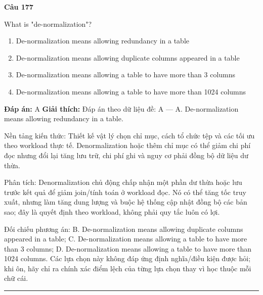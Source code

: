 \documentclass[11pt,a4paper]{article}
\newenvironment{question}[1]{%
  \par\vspace{1em}\noindent\textbf{\large Câu #1}\par\vspace{0.4em}
}{%
  \par\vspace{1em}\hrule\vspace{0.6em}
}
\newenvironment{choices}{%
  \begin{enumerate}[label=\textbf{\Alph*.},leftmargin=2.2em,itemsep=2pt,topsep=3pt]
}{%
  \end{enumerate}
}
\newcommand{\choice}{\item}
\begin{document}
\begin{question}{177}
What is "de-normalization"?
\begin{choices}
\choice De-normalization means allowing redundancy in a table
\choice De-normalization means allowing duplicate columns appeared in a table
\choice De-normalization means allowing a table to have more than 3 columns
\choice De-normalization means allowing a table to have more than 1024 columns
\end{choices}
\textbf{Đáp án:} A
\textbf{Giải thích:} Đáp án theo dữ liệu đề: A — A. De-normalization means allowing redundancy in a table.

Nền tảng kiến thức: Thiết kế vật lý chọn chỉ mục, cách tổ chức tệp và các tối ưu theo workload thực tế. Denormalization hoặc thêm chỉ mục có thể giảm chi phí đọc nhưng đổi lại tăng lưu trữ, chi phí ghi và nguy cơ phải đồng bộ dữ liệu dư thừa.

Phân tích: Denormalization chủ động chấp nhận một phần dư thừa hoặc lưu trước kết quả để giảm join/tính toán ở workload đọc. Nó có thể tăng tốc truy xuất, nhưng làm tăng dung lượng và buộc hệ thống cập nhật đồng bộ các bản sao; đây là quyết định theo workload, không phải quy tắc luôn có lợi.

Đối chiếu phương án: B. De-normalization means allowing duplicate columns appeared in a table; C. De-normalization means allowing a table to have more than 3 columns; D. De-normalization means allowing a table to have more than 1024 columns. Các lựa chọn này không đáp ứng định nghĩa/điều kiện được hỏi; khi ôn, hãy chỉ ra chính xác điểm lệch của từng lựa chọn thay vì học thuộc mỗi chữ cái.
\end{question}
\end{document}
